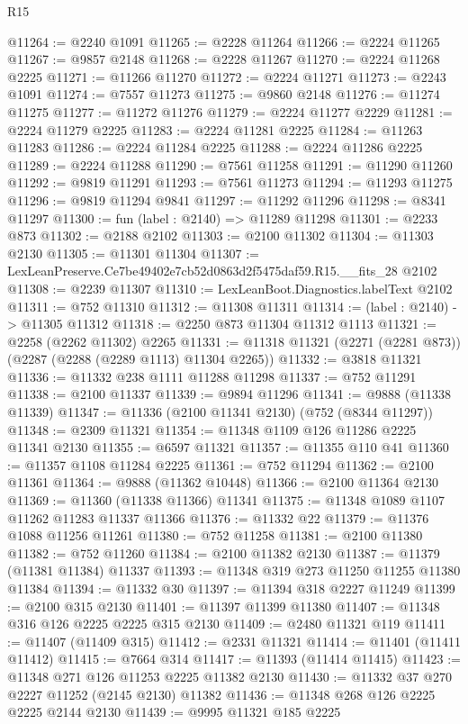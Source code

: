\begin{lexlean}{R15}
\begin{coremodule}
@11264 := @2240 @1091
@11265 := @2228 @11264
@11266 := @2224 @11265
@11267 := @9857 @2148
@11268 := @2228 @11267
@11270 := @2224 @11268 @2225
@11271 := @11266 @11270
@11272 := @2224 @11271
@11273 := @2243 @1091
@11274 := @7557 @11273
@11275 := @9860 @2148
@11276 := @11274 @11275
@11277 := @11272 @11276
@11279 := @2224 @11277 @2229
@11281 := @2224 @11279 @2225
@11283 := @2224 @11281 @2225
@11284 := @11263 @11283
@11286 := @2224 @11284 @2225
@11288 := @2224 @11286 @2225
@11289 := @2224 @11288
@11290 := @7561 @11258
@11291 := @11290 @11260
@11292 := @9819 @11291
@11293 := @7561 @11273
@11294 := @11293 @11275
@11296 := @9819 @11294 @9841
@11297 := @11292 @11296
@11298 := @8341 @11297
@11300 := fun (label : @2140) => @11289 @11298
@11301 := @2233 @873
@11302 := @2188 @2102
@11303 := @2100 @11302
@11304 := @11303 @2130
@11305 := @11301 @11304
@11307 := LexLeanPreserve.Ce7be49402e7cb52d0863d2f5475daf59.R15.__fits_28 @2102
@11308 := @2239 @11307
@11310 := LexLeanBoot.Diagnostics.labelText @2102
@11311 := @752 @11310
@11312 := @11308 @11311
@11314 := (label : @2140) -> @11305 @11312
@11318 := @2250 @873 @11304 @11312 @1113
@11321 := @2258 (@2262 @11302) @2265
@11331 := @11318 @11321 (@2271 (@2281 @873)) (@2287 (@2288 (@2289 @1113) @11304 @2265))
@11332 := @3818 @11321
@11336 := @11332 @238 @1111 @11288 @11298
@11337 := @752 @11291
@11338 := @2100 @11337
@11339 := @9894 @11296
@11341 := @9888 (@11338 @11339)
@11347 := @11336 (@2100 @11341 @2130) (@752 (@8344 @11297))
@11348 := @2309 @11321
@11354 := @11348 @1109 @126 @11286 @2225 @11341 @2130
@11355 := @6597 @11321
@11357 := @11355 @110 @41
@11360 := @11357 @1108 @11284 @2225
@11361 := @752 @11294
@11362 := @2100 @11361
@11364 := @9888 (@11362 @10448)
@11366 := @2100 @11364 @2130
@11369 := @11360 (@11338 @11366) @11341
@11375 := @11348 @1089 @1107 @11262 @11283 @11337 @11366
@11376 := @11332 @22
@11379 := @11376 @1088 @11256 @11261
@11380 := @752 @11258
@11381 := @2100 @11380
@11382 := @752 @11260
@11384 := @2100 @11382 @2130
@11387 := @11379 (@11381 @11384) @11337
@11393 := @11348 @319 @273 @11250 @11255 @11380 @11384
@11394 := @11332 @30
@11397 := @11394 @318 @2227 @11249
@11399 := @2100 @315 @2130
@11401 := @11397 @11399 @11380
@11407 := @11348 @316 @126 @2225 @2225 @315 @2130
@11409 := @2480 @11321 @119
@11411 := @11407 (@11409 @315)
@11412 := @2331 @11321
@11414 := @11401 (@11411 @11412)
@11415 := @7664 @314
@11417 := @11393 (@11414 @11415)
@11423 := @11348 @271 @126 @11253 @2225 @11382 @2130
@11430 := @11332 @37 @270 @2227 @11252 (@2145 @2130) @11382
@11436 := @11348 @268 @126 @2225 @2225 @2144 @2130
@11439 := @9995 @11321 @185 @2225

\end{coremodule}
\end{lexlean}
